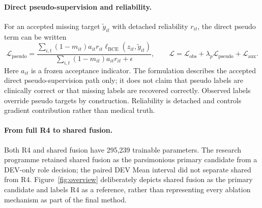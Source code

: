 \paragraph{Direct pseudo-supervision and reliability.} For an accepted missing target $\tilde y_{it}$ with detached reliability $r_{it}$, the direct pseudo term can be written
\begin{equation}
 \mathcal{L}_{\mathrm{pseudo}}=\frac{\sum_{i,t}(1-m_{it})a_{it}r_{it}\ell_{\mathrm{BCE}}(z_{it},\tilde y_{it})}{\sum_{i,t}(1-m_{it})a_{it}r_{it}+\epsilon},
 \qquad \mathcal{L}=\mathcal{L}_{\mathrm{obs}}+\lambda_p\mathcal{L}_{\mathrm{pseudo}}+\mathcal{L}_{\mathrm{aux}}.
\end{equation}
Here $a_{it}$ is a frozen acceptance indicator. The formulation describes the accepted direct pseudo-supervision path only; it does not claim that pseudo labels are clinically correct or that missing labels are recovered correctly. Observed labels override pseudo targets by construction. Reliability is detached and controls gradient contribution rather than medical truth.

\paragraph{From full R4 to shared fusion.} Both R4 and shared fusion have 295,239 trainable parameters. The research programme retained shared fusion as the parsimonious primary candidate from a DEV-only role decision; the paired DEV Mean interval did not separate shared from R4. Figure~\ref{fig:overview} deliberately depicts shared fusion as the primary candidate and labels R4 as a reference, rather than representing every ablation mechanism as part of the final method.
